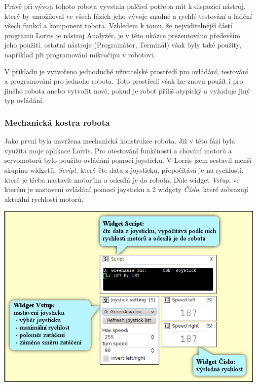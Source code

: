 \documentclass[12pt, a4paper, oneside]{article}
\newcommand{\It}{\textit}  %
\begin{document}
Právě při vývoji tohoto robota vyvstala palčivá potřeba mít k dispozici nástroj, který by umožňoval ve všech fázích jeho vývoje snadné a rychlé testování a ladění všech funkcí a komponent robota. Vzhledem k tomu, že nejviditelnější částí programu Lorris je nástroj Analyzér, je v této ukázce prezentováno především jeho použití, ostatní nástroje (Programátor, Terminál) však byly také použity, například při programování mikročipu v robotovi.

V příkladu je vytvořeno jednoduché uživatelské prostředí pro ovládání, testování a programování pro jednoho robota. Toto prostředí však lze znovu použít i pro jiného robota anebo vytvořit nové, pokud je robot příliš atypický a vyžaduje jiný typ ovládání.


\newpage
\subsubsection{Mechanická kostra robota}
Jako první byla navržena mechanická konstrukce robota. Již v této fázi byla využita moje aplikace Lorris. Pro otestování funkčnosti a chování motorů a servomotorů bylo použito ovládání pomocí joysticku. V Lorris jsem sestavil menší skupinu widgetů: \It{Script}, který čte data z joysticku, přepočítává je na rychlosti, které je třeba nastavit motorům a odesílá je do robota. Dále widget \It{Vstup}, ve kterém je nastavení ovládání pomocí joysticku a 2 widgety \It{Číslo}, které zobrazují aktuální rychlosti motorů.
\vspace{30mm}
\begin{center}
\includegraphics[width=\textwidth]{img/joystick_david.png}
\end{center}
\end{document}
